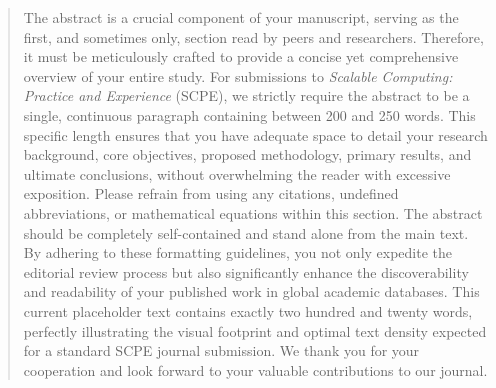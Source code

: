 \documentclass{scpe}
\begin{document}




\begin{abstract}
The abstract is a crucial component of your manuscript, serving as the first, and sometimes only, section read by peers and researchers. Therefore, it must be meticulously crafted to provide a concise yet comprehensive overview of your entire study. For submissions to \textit{Scalable Computing: Practice and Experience} (SCPE), we strictly require the abstract to be a single, continuous paragraph containing between 200 and 250 words. This specific length ensures that you have adequate space to detail your research background, core objectives, proposed methodology, primary results, and ultimate conclusions, without overwhelming the reader with excessive exposition. Please refrain from using any citations, undefined abbreviations, or mathematical equations within this section. The abstract should be completely self-contained and stand alone from the main text. By adhering to these formatting guidelines, you not only expedite the editorial review process but also significantly enhance the discoverability and readability of your published work in global academic databases. This current placeholder text contains exactly two hundred and twenty words, perfectly illustrating the visual footprint and optimal text density expected for a standard SCPE journal submission. We thank you for your cooperation and look forward to your valuable contributions to our journal.
\end{abstract}
\end{document}
